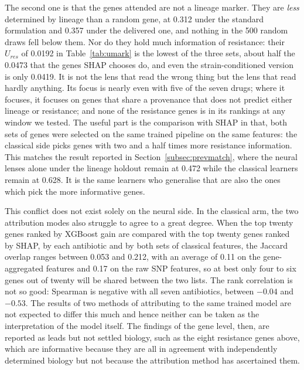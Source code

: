 The second one is that the genes attended are not a lineage marker. They are \textit{less}
determined by lineage than a random gene, at 0.312 under the standard formulation and 0.357
under the delivered one, and nothing in the 500 random draws fell below them. Nor do they hold
much information of resistance: their $U_{res}$ of 0.0192 in Table~\ref{tab:umark} is the lowest
of the three sets, about half the 0.0473 that the genes SHAP chooses do, and even the
strain-conditioned version is only 0.0419. It is not the lens that read the wrong thing but the
lens that read hardly anything. Its focus is nearly even with five of the seven drugs; where it
focuses, it focuses on genes that share a provenance that does not predict either lineage or
resistance; and none of the resistance genes is in its rankings at any window we tested. The
useful part is the comparison with SHAP in that, both sets of genes were selected on the same
trained pipeline on the same features: the classical side picks genes with two and a half times
more resistance information. This matches the result reported in Section~\ref{subsec:prevmatch},
where the neural lenses alone under the lineage holdout remain at 0.472 while the classical learners
remain at 0.628. It is the same learners who generalise that are also the ones which pick the more
informative genes.

\vspace{1em}

This conflict does not exist solely on the neural side. In the classical arm, the two attribution
modes also struggle to agree to a great degree. When the top twenty genes ranked by XGBoost gain
are compared with the top twenty genes ranked by SHAP, by each antibiotic and by both sets of
classical features, the Jaccard overlap ranges between 0.053 and 0.212, with an average of 0.11 on
the gene-aggregated features and 0.17 on the raw SNP features, so at best only four to six genes
out of twenty will be shared between the two lists. The rank correlation is not so good: Spearman
is negative with all seven antibiotics, between $-0.04$ and $-0.53$. The results of two methods of
attributing to the same trained model are not expected to differ this much and hence neither can
be taken as the interpretation of the model itself. The findings of the gene level, then, are
reported as leads but not settled biology, such as the eight resistance genes above, which are
informative because they are all in agreement with independently determined biology but not
because the attribution method has ascertained them.

